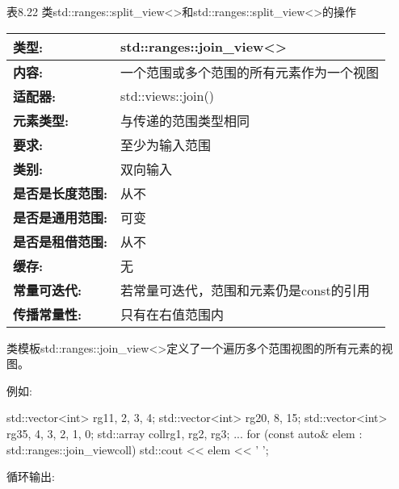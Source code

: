 \begin{center}
表8.22 类std::ranges::split\_view<>和std::ranges::split\_view<>的操作
\end{center}


\begin{longtable}[c]{|l|l|}
\hline
\textbf{类型:}           & std::ranges::join\_view\textless{}\textgreater{}                        \\ \hline
\endfirsthead
%
\endhead
%
\textbf{内容:}        & 一个范围或多个范围的所有元素作为一个视图                  \\ \hline
\textbf{适配器:}              & std::views::join()         \\ \hline
\textbf{元素类型:}         & 与传递的范围类型相同 \\ \hline
\textbf{要求:}             & 至少为输入范围       \\ \hline
\textbf{类别:}             & 双向输入     \\ \hline
\textbf{是否是长度范围:}       & 从不                      \\ \hline
\textbf{是否是通用范围:}      & 可变                     \\ \hline
\textbf{是否是租借范围:}    & 从不                      \\ \hline
\textbf{缓存:}               & 无                    \\ \hline
\textbf{常量可迭代:} & 若常量可迭代，范围和元素仍是const的引用 \\ \hline
\textbf{传播常量性:} & 只有在右值范围内    \\ \hline
\end{longtable}

类模板std::ranges::join\_view<>定义了一个遍历多个范围视图的所有元素的视图。

例如:

\begin{cpp}
std::vector<int> rg1{1, 2, 3, 4};
std::vector<int> rg2{0, 8, 15};
std::vector<int> rg3{5, 4, 3, 2, 1, 0};
std::array coll{rg1, rg2, rg3};
...
for (const auto& elem : std::ranges::join_view{coll}) {
	std::cout << elem << ' ';
}
\end{cpp}

循环输出:

